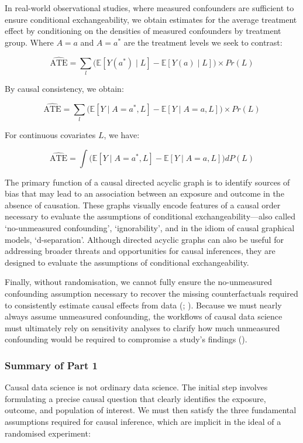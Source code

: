 \documentclass[
  single column]{article}
\begin{document}
In real-world observational studies, where measured confounders are
sufficient to ensure conditional exchangeability, we obtain estimates
for the average treatment effect by conditioning on the densities of
measured confounders by treatment group. Where \(A = a\) and \(A = a^*\)
are the treatment levels we seek to contrast:

\[
\widehat{\text{ATE}} =  \sum_l \big( \mathbb{E}[Y(a^*) \mid L] - \mathbb{E}[Y(a) \mid L] \big) \times Pr(L)
\]

By causal consistency, we obtain:

\[
\widehat{\text{ATE}} =  \sum_l \big( \mathbb{E}[Y \mid A = a^*, L] - \mathbb{E}[Y \mid A = a, L] \big) \times Pr(L)
\]

For continuous covariates \(L\), we have:

\[
\widehat{\text{ATE}} = \int \big( \mathbb{E}[Y \mid A = a^*, L] - \mathbb{E}[Y \mid A = a, L] \big) dP(L)
\]

The primary function of a causal directed acyclic graph is to identify
sources of bias that may lead to an association between an exposure and
outcome in the absence of causation. These graphs visually encode
features of a causal order necessary to evaluate the assumptions of
conditional exchangeability---also called `no-unmeasured confounding',
`ignorability', and in the idiom of causal graphical models,
`d-separation'. Although directed acyclic graphs can also be useful for
addressing broader threats and opportunities for causal inferences, they
are designed to evaluate the assumptions of conditional exchangeability.

Finally, without randomisation, we cannot fully ensure the no-unmeasured
confounding assumption necessary to recover the missing counterfactuals
required to consistently estimate causal effects from data
(;
). Because we must
nearly always assume unmeasured confounding, the workflows of causal
data science must ultimately rely on sensitivity analyses to clarify how
much unmeasured confounding would be required to compromise a study's
findings ().

\subsubsection{Summary of Part 1}\label{summary-of-part-1}

Causal data science is not ordinary data science. The initial step
involves formulating a precise causal question that clearly identifies
the exposure, outcome, and population of interest. We must then satisfy
the three fundamental assumptions required for causal inference, which
are implicit in the ideal of a randomised experiment:
\end{document}
